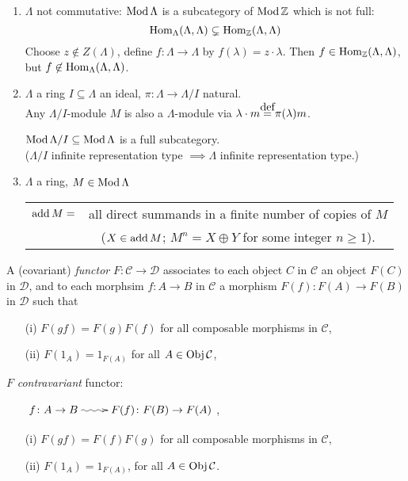 \begin{exam}
\begin{enumerate}
\item $\Lambda$ not commutative: $\operatorname{Mod} \Lambda$ is a subcategory of
  $\operatorname{Mod}\mathbb{Z}$ which is not full: 
\[\operatorname{Hom}_\Lambda(\Lambda, \Lambda)
    \subsetneq \operatorname{Hom}_\mathbb{Z}(\Lambda, \Lambda)\] 
Choose $z \not\in Z(\Lambda)$, define $f\colon  \Lambda \to \Lambda$ by
$f(\lambda) = z\cdot \lambda$. Then $f \in \operatorname{Hom}_\mathbb{Z}(\Lambda,
\Lambda)$, but $f \not\in \operatorname{Hom}_\Lambda(\Lambda,\Lambda)$. 

\item $\Lambda$ a ring $I \subseteq \Lambda$ an ideal, $\pi \colon  \Lambda \to \Lambda/I$ natural.\\
Any $\Lambda/I$-module $M$ is also a $\Lambda$-module via $\lambda
\cdot m \stackrel{\mathclap{\normalfont\mbox{def}}}{=} \pi(\lambda)m$. 
\begin{exer}
$\operatorname{Mod} \Lambda/I \subseteq \operatorname{Mod} \Lambda$ is a full subcategory.\\
($\Lambda/I$ infinite representation type $\implies \Lambda$ infinite
representation type.) 
\end{exer}

\item $\Lambda$ a ring, $M \in \operatorname{Mod}\Lambda$\\
\begin{tabular}{cc}
$\operatorname{add} M = $ &all direct summands in a finite number of copies of
              $M$\\&($X \in \operatorname{add} M$; $M^n = X \oplus Y$ for some
                     integer $n\geq 1$).
\end{tabular}
\end{enumerate}
\end{exam}

\begin{defin}
A (covariant) \emph{functor} $F\colon  \mathcal{C} \to \mathcal{D}$
associates to each object $C$ in $\mathcal{C}$ an object $F(C)$ in
$\mathcal{D}$, and to each morphsim $f\colon A\to B$ in $\mathcal{C}$
a morphism $F(f)\colon F(A)\to F(B)$ in $\mathcal{D}$ such that 
\begin{enumerate}
\item[(i)] $F(gf) = F(g)F(f)$ for all composable morphisms in
  $\mathcal{C}$, 
\item[(ii)] $F(1_A) = 1_{F(A)}$ for all $A \in \operatorname{Obj} \mathcal{C}$, 
\end{enumerate}
$F$ \emph{contravariant} functor:
\begin{enumerate}
\item[] $\xymatrix{f\colon A\to B \ar@{~>}[r] & F(f)\colon  F(B) \to F(A)}$,
\item[(i)] $F(gf) = F(f)F(g)$ for all composable morphisms in
  $\mathcal{C}$, 
\item[(ii)] $F(1_A) = 1_{F(A)}$, for all $A \in \operatorname{Obj} \mathcal{C}$.
\end{enumerate}
\end{defin}

